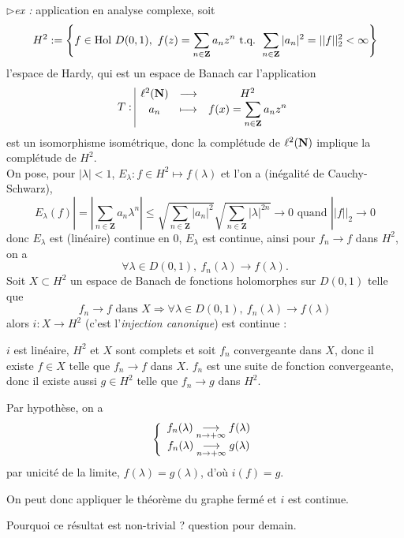 \documentclass[a4paper,11pt, twoside]{article}
\begin{document}
$\triangleright$\emph{ex :} application en analyse complexe, soit 
$$H^2:=\left\{f\in\mathrm{Hol}\ D(0,1),\ f(z)=\sum_{n\in\mathbf Z}a_n z^n \tq \sum_{n\in\mathbf Z}|a_n|^2=||f||_2^2<\infty\right\}$$
l'espace de Hardy, qui est un espace de Banach car l'application
$$T:\begin{array}{|ccc}
  \ell^2(\mathbf N)&\longrightarrow&H^2\\
   a_n&\longmapsto&f(x)=\displaystyle\sum_{n\in\mathbf Z}a_n z^n
\end{array}$$
est un isomorphisme isométrique, donc la complétude de $ \ell^2(\mathbf N)$ implique la complétude de $H^2$.\\

On pose, pour $|\lambda|<1$, $E_\lambda:f\in H^2\longmapsto f(\lambda)$ et l'on a (inégalité de Cauchy-Schwarz),
$$E_{\lambda}(f)|=\left|\sum_{n\in\mathbf Z}a_n\lambda^n\right|\leqslant \sqrt{\sum_{n\in\mathbf Z}|a_n|^2}\sqrt{\sum_{n\in\mathbf Z}|\lambda|^{2n}}\longrightarrow 0\text{ quand }||f||_2\to 0$$
donc $E_\lambda$ est (linéaire) continue en 0, $E_\lambda$ est continue, ainsi pour $f_n\to f$ dans $H^2$, on a 
$$\forall \lambda\in D(0,1),\ f_n(\lambda)\longrightarrow f(\lambda).$$
Soit $X\subset H^2$ un espace de Banach de fonctions holomorphes sur $D(0,1)$ telle que 
$$f_n\longrightarrow f\text{ dans }X\Rightarrow\forall \lambda\in D(0,1),\ f_n(\lambda)\longrightarrow f(\lambda)$$
alors $i:X\longrightarrow H^2$ (c'est l'\emph{injection canonique}) est continue :

\begin{Proof}
  $i$ est linéaire, $H^2$ et $X$ sont complets et soit $f_n$ convergeante dans $X$, donc il existe $f\in X$ telle que $f_n\longrightarrow f$ dans $X$. $f_n$ est une suite de fonction convergeante, donc il existe aussi $g\in H^2$ telle que $f_n\longrightarrow g$ dans $H^2$.

  Par hypothèse, on a 
  $$\left\{\begin{array}{c}
    f_n(\lambda)\underset{n\to+\infty}{\longrightarrow} f(\lambda)\\
    f_n(\lambda)\underset{n\to+\infty}{\longrightarrow} g(\lambda)
  \end{array}\right.$$
  par unicité de la limite, $f(\lambda)=g(\lambda)$, d'où $i(f)=g$.

  On peut donc appliquer le théorème du graphe fermé et $i$ est continue.
\end{Proof}


Pourquoi ce résultat est non-trivial ? question pour demain.



\end{document}
